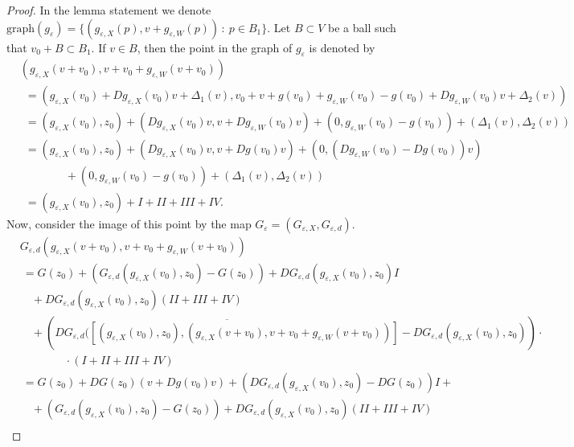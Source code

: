 \documentclass[11pt, leqno]{amsart}
\theoremstyle{definition}
\begin{document}
	 		\begin{proof}
	 			In the lemma statement we denote $\textrm{graph}(g_\varepsilon) = \{ (g_{\varepsilon,X}(p),v+g_{\varepsilon,W}(p))\,:\ p\in B_1 \}$. Let $B\subset V$ be a ball such that $v_0+B\subset B_1$.
 If $v\in B$, then the point in the graph of $g_\varepsilon$ is denoted by
	 			\begin{align*}
	 				&  (g_{\varepsilon,X}(v+v_0),v+v_0+g_{\varepsilon,W}(v+v_0)) \\
	 				& \ \ =    \left(g_{\varepsilon,X}(v_0)+Dg_{\varepsilon,X}(v_0)v+\Delta_1(v),v_0+v+g(v_0)+g_{\varepsilon,W}(v_0)-g(v_0)+
	 				Dg_{\varepsilon,W}(v_0)v+\Delta_2(v)\right)\\
	 				& \ \ = (g_{\varepsilon,X}(v_0),z_0) + \left(Dg_{\varepsilon,X}(v_0)v,v+Dg_{\varepsilon,W}(v_0)v\right) + (0,g_{\varepsilon,W}(v_0)-g(v_0)) +  \left(\Delta_1(v),\Delta_2(v)\right)\\
	 				& \ \  = (g_{\varepsilon,X}(v_0),z_0) + \left(Dg_{\varepsilon,X}(v_0)v,v+Dg(v_0)v\right) +   \left(0,\left(Dg_{\varepsilon,W}(v_0)-Dg(v_0)\right)v\right) \\
	 				& \qquad \qquad + (0,g_{\varepsilon,W}(v_0)-g(v_0)) +  \left(\Delta_1(v),\Delta_2(v)\right)\\
	 				& \ \  = (g_{\varepsilon,X}(v_0),z_0) + I + II + III + IV.
	 			\end{align*}
	 			Now, consider the image of this point by the map $G_\varepsilon=(G_{\varepsilon,X},G_{\varepsilon,d})$.
	 			\begin{align*}
	 				& G_{\varepsilon,d}(g_{\varepsilon,X}(v+v_0),v+v_0+g_{\varepsilon,W}(v+v_0)) \\
	 				& \  = G(z_0) + (G_{\varepsilon,d}(g_{\varepsilon,X}(v_0),z_0)-G(z_0)) + D G_{\varepsilon,d}(g_{\varepsilon,X}(v_0),z_0)I \\
	 				& \quad + DG_{\varepsilon,d}(g_{\varepsilon,X}(v_0),z_0)(II+III+IV)\\
	 				& \quad +(\overline{DG_{\varepsilon,d}([(g_{\varepsilon,X}(v_0),z_0),(g_{\varepsilon,X}(v+v_0),v+v_0+g_{\varepsilon,W}(v+v_0))]}-DG_{\varepsilon,d}(g_{\varepsilon,X}(v_0),z_0))\cdot\\
	 				& \qquad \qquad \cdot(I+II+III+IV)\\
	 				& \  = G(z_0) + DG(z_0)\left(v+Dg(v_0)v\right)  + \left(D G_{\varepsilon,d}(g_{\varepsilon,X}(v_0),z_0)-DG(z_0)\right)I + \\
	 				& \quad  +  (G_{\varepsilon,d}(g_{\varepsilon,X}(v_0),z_0)-G(z_0)) + D G_{\varepsilon,d}(g_{\varepsilon,X}(v_0),z_0)(II+III+IV)\\

\end{align*}
\end{proof}
\end{document}

